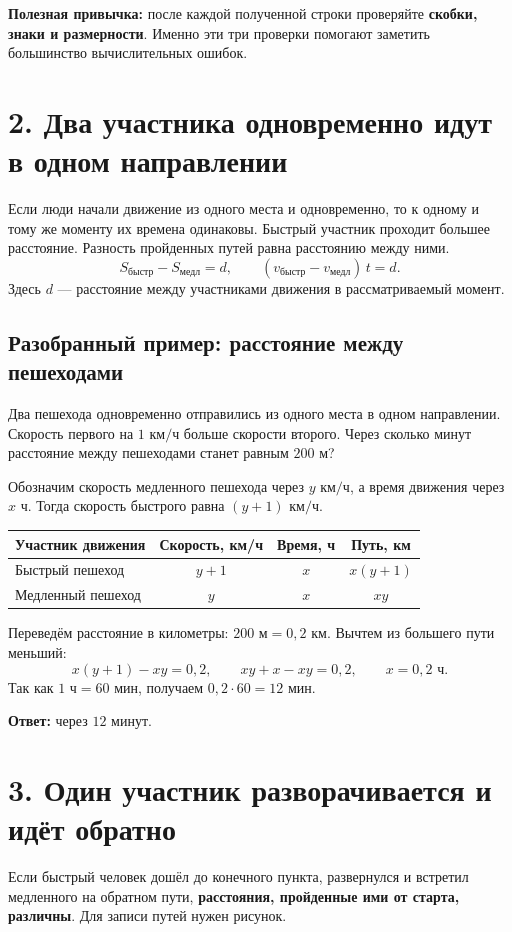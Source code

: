 \documentclass[a4paper,12pt]{article}
\newcommand{\topic}[1]{\section*{\color{darkaccent}#1}}
\newcommand{\subtopic}[1]{\subsection*{\color{accent}#1}}
\newcommand{\key}[1]{\textbf{\color{darkaccent}#1}}
\newcommand{\kmh}{\text{ км/ч}}
\newcommand{\kms}{\text{ км}}
\newcommand{\minu}{\text{ мин}}
\newcommand{\hour}{\text{ ч}}
\newcommand{\met}{\text{ м}}
\newcommand{\tabheaders}{\toprule Участник движения & Скорость, км/ч & Время, ч & Путь, км\\\midrule}
\begin{document}
\key{Полезная привычка:} после каждой полученной строки проверяйте \textbf{скобки, знаки и размерности}. Именно эти три проверки помогают заметить большинство вычислительных ошибок.

\topic{2. Два участника одновременно идут в одном направлении}
Если люди начали движение из одного места и одновременно, то к одному и тому же моменту их времена одинаковы. Быстрый участник проходит большее расстояние. Разность пройденных путей равна расстоянию между ними.
\[
S_{\text{быстр}}-S_{\text{медл}}=d,
\qquad (v_{\text{быстр}}-v_{\text{медл}})\,t=d.
\]
Здесь $d$ --- расстояние между участниками движения в рассматриваемый момент.

\subtopic{Разобранный пример: расстояние между пешеходами}
Два пешехода одновременно отправились из одного места в одном направлении. Скорость первого на $1\kmh$ больше скорости второго. Через сколько минут расстояние между пешеходами станет равным $200\met$?

Обозначим скорость медленного пешехода через $y\kmh$, а время движения через $x\hour$. Тогда скорость быстрого равна $(y+1)\kmh$.
\begin{center}
\renewcommand{\arraystretch}{1.2}
\begin{tabularx}{\linewidth}{Xccc}
\tabheaders
Быстрый пешеход & $y+1$ & $x$ & $x(y+1)$\\
Медленный пешеход & $y$ & $x$ & $xy$\\
\bottomrule
\end{tabularx}
\end{center}
Переведём расстояние в километры: $200\met=0{,}2\kms$. Вычтем из большего пути меньший:
\[
x(y+1)-xy=0{,}2,\qquad xy+x-xy=0{,}2,\qquad x=0{,}2\hour.
\]
Так как $1\hour=60\minu$, получаем $0{,}2\cdot60=12\minu$.
\par\key{Ответ:} через $12$ минут.

\topic{3. Один участник разворачивается и идёт обратно}
Если быстрый человек дошёл до конечного пункта, развернулся и встретил медленного на обратном пути, \key{расстояния, пройденные ими от старта, различны}. Для записи путей нужен рисунок.

\begin{center}
\end{center}
\end{document}
